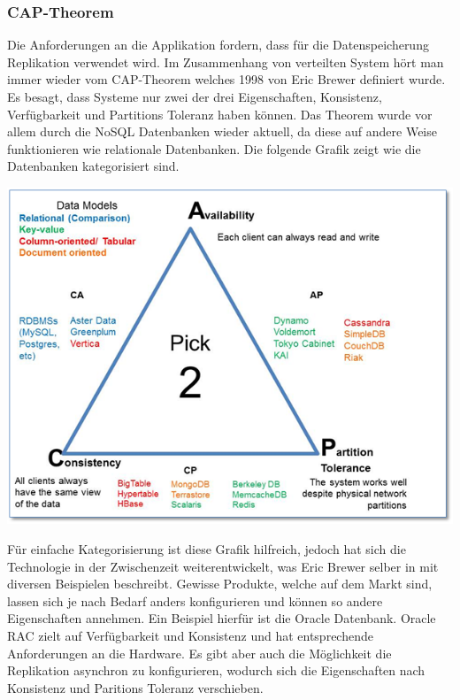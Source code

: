 \subsubsection{CAP-Theorem}
Die Anforderungen an die Applikation fordern, dass für die Datenspeicherung Replikation verwendet wird. Im Zusammenhang von verteilten System hört man immer wieder vom CAP-Theorem welches 1998 von Eric Brewer definiert wurde. Es besagt, dass Systeme nur zwei der drei Eigenschaften, Konsistenz, Verfügbarkeit und Partitions Toleranz haben können. Das Theorem wurde vor allem durch die NoSQL Datenbanken wieder aktuell, da diese auf andere Weise funktionieren wie relationale Datenbanken. Die folgende Grafik zeigt wie die Datenbanken kategorisiert sind.
\begin{center}
	\includegraphics[scale=0.60]{cap.png}\newline
	\cite{cap}
\end{center}
Für einfache Kategorisierung ist diese Grafik hilfreich, jedoch hat sich die Technologie in der Zwischenzeit weiterentwickelt, was Eric Brewer selber in \cite{capnew} mit diversen Beispielen beschreibt. Gewisse Produkte, welche auf dem Markt sind, lassen sich je nach Bedarf anders konfigurieren und können so andere Eigenschaften annehmen. Ein Beispiel hierfür ist die Oracle Datenbank. Oracle RAC zielt auf Verfügbarkeit und Konsistenz und hat entsprechende Anforderungen an die Hardware. Es gibt aber auch die Möglichkeit die Replikation asynchron zu konfigurieren, wodurch sich die Eigenschaften nach Konsistenz und Paritions Toleranz verschieben. 

